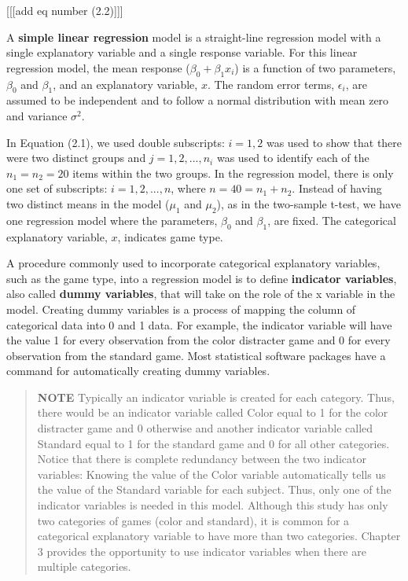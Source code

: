\documentclass[
]{report}
\begin{document}
{[}{[}{[}add eq number (2.2){]}{]}{]}

A \textbf{simple linear regression} model is a straight-line regression model with a single explanatory variable and a single response variable. For this linear regression model, the mean response (\(\beta_0 + \beta_1x_i\)) is a function of two parameters, \(\beta_0\) and \(\beta_1\), and an explanatory variable, \(x\). The random error terms, \(\epsilon_i\), are assumed to be independent and to follow a normal distribution with mean zero and variance \(\sigma^2\).

In Equation (2.1), we used double subscripts: \(i = 1, 2\) was used to show that there were two distinct groups and \(j = 1, 2, ... , n_i\) was used to identify each of the \(n_1 = n_2 = 20\) items within the two groups. In the regression model, there is only one set of subscripts: \(i = 1, 2, ..., n\), where \(n = 40 = n_1 + n_2\). Instead of having two distinct means in the model (\(\mu_1\) and \(\mu_2\)), as in the two-sample t-test, we have one regression model where the parameters, \(\beta_0\) and \(\beta_1\), are fixed. The categorical explanatory variable, \(x\), indicates game type.

A procedure commonly used to incorporate categorical explanatory variables, such as the game type, into a regression model is to define \textbf{indicator variables}, also called \textbf{dummy variables}, that will take on the role of the x variable in the model. Creating dummy variables is a process of mapping the column of categorical data into 0 and 1 data. For example, the indicator variable will have the value 1 for every observation from the color distracter game and 0 for every observation from the standard game. Most statistical software packages have a command for automatically creating dummy variables.

\begin{quote}
\textbf{NOTE}
Typically an indicator variable is created for each category. Thus, there would be an indicator variable called Color equal to 1 for the color distracter game and 0 otherwise and another indicator variable called Standard equal to 1 for the standard game and 0 for all other categories. Notice that there is complete redundancy between the two indicator variables: Knowing the value of the Color variable automatically tells us the value of the Standard variable for each subject. Thus, only one of the indicator variables is needed in this model. Although this study has only two categories of games (color and standard), it is common for a categorical explanatory variable to have more than two categories. Chapter 3 provides the opportunity to use indicator variables when there are multiple categories.
\end{quote}
\end{document}
